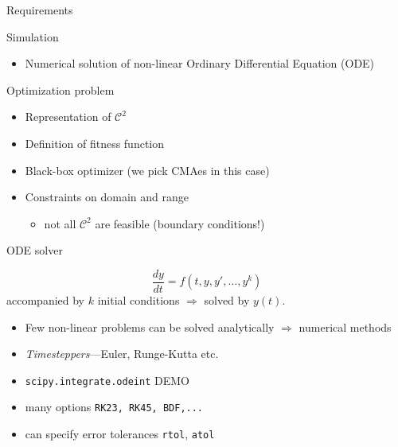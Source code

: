 \documentclass[presentation]{beamer}
\begin{document}
\begin{frame}[label={sec:org27c790c}]{Requirements}
\begin{alertblock}{Simulation}
\begin{itemize}
\item \alert{Numerical solution} of non-linear Ordinary Differential Equation (ODE)
\end{itemize}
\end{alertblock}
\begin{alertblock}{Optimization problem}
\begin{itemize}
\item \alert{Representation} of \(\mathcal{C}^2\)
\item Definition of \alert{fitness function}
\item Black-box \alert{optimizer} (we pick CMAes in this case)
\item \alert{Constraints} on domain and range
\begin{itemize}
\item not all \(\mathcal{C}^2\) are feasible (boundary conditions!)
\end{itemize}
\end{itemize}
\end{alertblock}
\end{frame}
\begin{frame}[label={sec:org177970b},fragile]{ODE solver}
 \begin{definition}
\[ \frac{dy}{dt} = f(t, y, y', \dots, y^{k})\]
accompanied by \(k\) initial conditions \(\Rightarrow\) solved by \(y(t)\).
\begin{itemize}
\item Few non-linear problems can be solved analytically \(\Rightarrow\) \alert{numerical methods}
\item \emph{Timesteppers}---Euler, Runge-Kutta etc.
\end{itemize}
\end{definition}
\begin{example}
\begin{itemize}
\item \texttt{scipy.integrate.odeint} \alert{DEMO}
\item many options \texttt{RK23, RK45, BDF,...}
\item can specify error tolerances \texttt{rtol}, \texttt{atol}
\end{itemize}
\end{example}
\end{frame}
\end{document}
